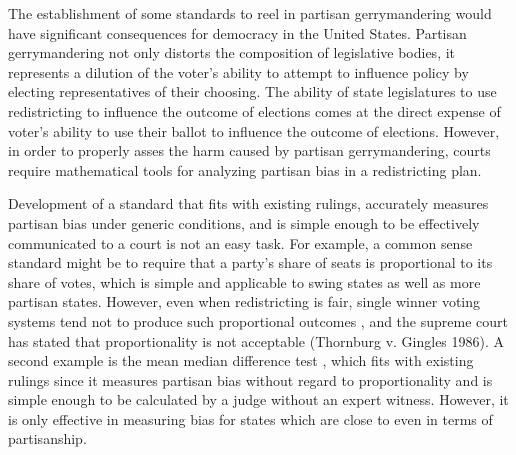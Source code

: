\documentclass[preprint,12pt]{article}
\begin{document}
The establishment of some standards to reel in partisan gerrymandering would have significant consequences for democracy in the United States.
Partisan gerrymandering not only distorts the composition of legislative bodies, it represents a dilution of the voter's ability to attempt to influence policy by electing representatives of their choosing.
The ability of state legislatures to use redistricting to influence the outcome of elections comes at the direct expense of voter's ability to use their ballot to influence the outcome of elections.
However, in order to properly asses the harm caused by partisan gerrymandering, courts require mathematical tools for analyzing partisan bias in a redistricting plan.

Development of a standard that fits with existing rulings, accurately measures partisan bias under generic conditions, and is simple enough to be effectively communicated to a court is not an easy task.
For example, a common sense standard might be to require that a party's share of seats is proportional to its share of votes, which is simple and applicable to swing states as well as more partisan states.
However, even when redistricting is fair, single winner voting systems tend not to produce such proportional outcomes \cite{Kendall_1950_10.2307/588113}, and the supreme court has stated that proportionality is not acceptable (Thornburg v. Gingles 1986).
A second example is the mean median difference test \cite{Wang__,Wang_2016_10.1089/elj.2016.0387,McDonald_2015_10.1089/elj.2015.0358}, which fits with existing rulings since it measures partisan bias without regard to proportionality and is simple enough to be calculated by a judge without an expert witness.
However, it is only effective in measuring bias for states which are close to even in terms of partisanship. \cite{Wang_2016_10.1089/elj.2016.0387}
\end{document}
